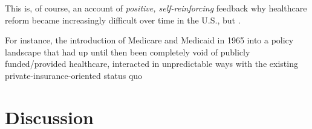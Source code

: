 \documentclass[11pt]{article}
\begin{document}
This is, of course, an account of \textit{positive, self-reinforcing} feedback why healthcare reform became increasingly difficult over time in the U.S., but \textcite[][]{Hacker1998} .

For instance, the introduction of Medicare and Medicaid in 1965 into a policy landscape that had up until then been completely void of publicly funded/provided healthcare, interacted in unpredictable ways with the existing private-insurance-oriented status quo





\section*{Discussion}

\newpage
\newpage
\thispagestyle{empty}
\begingroup
{}
\printbibliography
\endgroup
\end{document}
